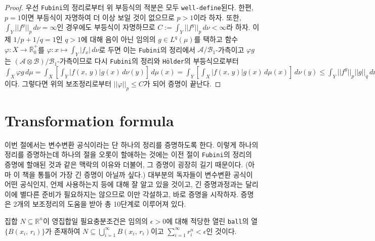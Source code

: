 \begin{proof}
    우선 \texttt{Fubini}의 정리로부터 위 부등식의 적분은 모두 \texttt{well-define}된다. 한편, $p=1$이면 부등식이 자명하여 더 이상 보일 것이 없으므로 $p>1$이라 하자. 또한, $\int_Y||f^y||_p\,d\nu=\infty$인 경우에도 부등식이 자명하므로 $C:=\int_Y||f^y||_p\,d\nu<\infty$라 하자. 이제 $1/p+1/q=1$인 $q>1$에 대해 음이 아닌 임의의 $g\in L^q(\mu)$를 택하고 함수 $\varphi:X\to\overline{\mathbb{R}}^+_0$를 $\varphi:x\mapsto\int_Y|f_x|\,d\nu$로 두면 이는 \texttt{Fubini}의 정리에서 $\mathcal{A}/\mathcal{B}_1$-가측이고 $\varphi g$는 $(\mathcal{A}\otimes\mathcal{B})/\mathcal{B}_1$-가측이므로 다시 \texttt{Fubini}의 정리와 \texttt{H\"older}의 부등식으로부터 $\int_X\varphi g\,d\mu=\int_X[\int_Y|f(x,\,y)|g(x)\,d\nu(y)]\,d\mu(x)=\int_Y[\int_X|f(x,\,y)|g(x)\,d\mu(x)]\,d\nu(y)\leq\int_Y||f^y||_p||g||_q\,d\nu(y)=C||g||_q$이다. 그렇다면 위의 보조정리로부터 $||\varphi||_p\leq C$가 되어 증명이 끝난다.
\end{proof}

\section{Transformation formula}

이번 절에서는 변수변환 공식이라는 단 하나의 정리를 증명하도록 한다. 이렇게 하나의 정리를 증명하는데 하나의 절을 오롯이 할애하는 것에는 이전 절이 \texttt{Fubini}의 정리의 증명에 할애된 것과 같은 맥락의 이유와 더불어, 그 증명이 굉장히 길기 때문이다. (아마 이 책을 통틀어 가장 긴 증명이 아닐까 싶다.) 대부분의 독자들이 변수변환 공식이 어떤 공식인지, 언제 사용하는지 등에 대해 잘 알고 있을 것이고, 긴 증명과정과는 달리 이에 별다른 준비가 필요하지는 않으므로 이만 각설하고, 바로 증명을 시작하자. 증명은 2개의 보조정리의 도움을 받아 총 10단계로 이루어져 있다.

\begin{lemma}
    집합 $N\subseteq\mathbb{R}^n$이 영집합일 필요충분조건은 임의의 $\epsilon>0$에 대해 적당한 열린 \texttt{ball}의 열 $\{B(x_i,\,r_i)\}$가 존재하여 $N\subseteq\bigcup_{i=1}^\infty B(x_i,\,r_i)$이고 $\sum_{i=1}^\infty r_i^n<\epsilon$인 것이다.
\end{lemma}

